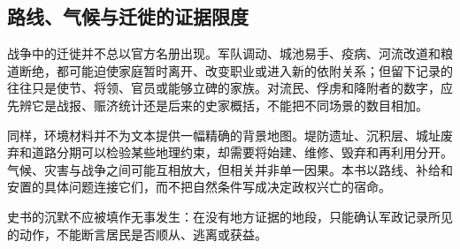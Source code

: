 \subsection{路线、气候与迁徙的证据限度}

战争中的迁徙并不总以官方名册出现。军队调动、城池易手、疫病、河流改道和粮道断绝，都可能迫使家庭暂时离开、改变职业或进入新的依附关系；但留下记录的往往只是使节、将领、官员或能够立碑的家族。对流民、俘虏和降附者的数字，应先辨它是战报、赈济统计还是后来的史家概括，不能把不同场景的数目相加。

同样，环境材料并不为文本提供一幅精确的背景地图。堤防遗址、沉积层、城址废弃和道路分期可以检验某些地理约束，却需要将始建、维修、毁弃和再利用分开。气候、灾害与战争之间可能互相放大，但相关并非单一因果。本书以路线、补给和安置的具体问题连接它们，而不把自然条件写成决定政权兴亡的宿命。

史书的沉默不应被填作无事发生：在没有地方证据的地段，只能确认军政记录所见的动作，不能断言居民是否顺从、逃离或获益。



